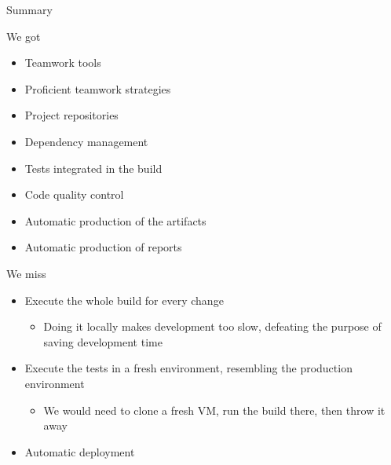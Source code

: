 \documentclass[presentation]{beamer}
\begin{document}
\begin{frame}{Summary}
	\begin{block} {We got}
		\begin{itemize}
			\item Teamwork tools
			\item Proficient teamwork strategies
			\item Project repositories
			\item Dependency management
			\item Tests integrated in the build
			\item Code quality control
			\item Automatic production of the artifacts
			\item Automatic production of reports
		\end{itemize}
	\end{block}
	\begin{block} {We miss}
		\begin{itemize}
			\item Execute the whole build for every change
			\begin{itemize}
				\item Doing it locally makes development too slow, defeating the purpose of saving development time
			\end{itemize}
			\item Execute the tests in a fresh environment, resembling the production environment
			\begin{itemize}
				\item We would need to clone a fresh VM, run the build there, then throw it away
			\end{itemize}
			\item Automatic deployment
		\end{itemize}
	\end{block}
\end{frame}
\end{document}
